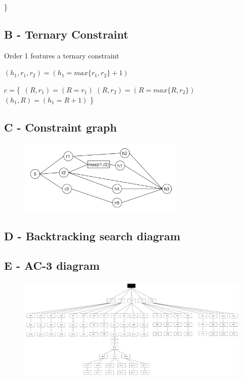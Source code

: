 \documentclass{article}
\begin{document}
\}\

\subsection{B - Ternary Constraint}
Order 1 features a ternary constraint 

$(h_1, r_1, r_2) = (h_1 = max\{r_1, r_2\} + 1)$ \newline

$c = $\{\
$(R, r_1) = (R = r_1)$ \newline
$(R, r_2) = (R = max\{R, r_2\})$ \newline
$(h_1, R) = (h_1 = R+1)$ \newline
\}\

\subsection{C - Constraint graph}

\begin{figure}[ht]
\includegraphics[width=8cm]{ConstraintGraph.png}
\centering
\end{figure}

\subsection{D - Backtracking search diagram}

\subsection{E - AC-3 diagram}

\begin{figure}[ht]
\includegraphics[width=18cm]{AC-3 Graph.png}
\centering
\end{figure}
\end{document}
